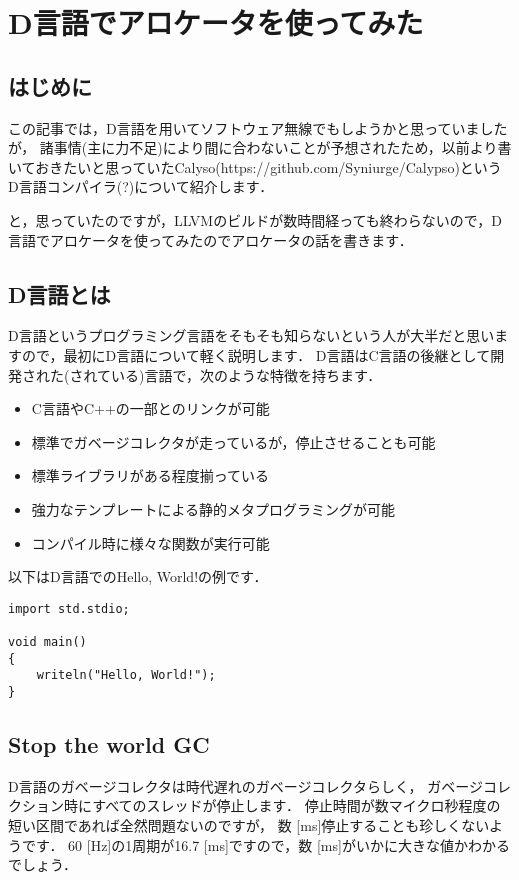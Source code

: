 \chapter{D言語でアロケータを使ってみた}

\section{はじめに}

この記事では，D言語を用いてソフトウェア無線でもしようかと思っていましたが，
諸事情(主に力不足)により間に合わないことが予想されたため，以前より書いておきたいと思っていたCalyso(https://github.com/Syniurge/Calypso)というD言語コンパイラ(?)について紹介します．

と，思っていたのですが，LLVMのビルドが数時間経っても終わらないので，D言語でアロケータを使ってみたのでアロケータの話を書きます．


\section{D言語とは}

D言語というプログラミング言語をそもそも知らないという人が大半だと思いますので，最初にD言語について軽く説明します．
D言語はC言語の後継として開発された(されている)言語で，次のような特徴を持ちます．

\begin{itemize}
\item C言語やC++の一部とのリンクが可能
\item 標準でガベージコレクタが走っているが，停止させることも可能
\item 標準ライブラリがある程度揃っている
\item 強力なテンプレートによる静的メタプログラミングが可能
\item コンパイル時に様々な関数が実行可能
\end{itemize}

以下はD言語でのHello, World!の例です．

\begin{lstlisting}[]
import std.stdio;

void main()
{
    writeln("Hello, World!");
}
\end{lstlisting}


\section{Stop the world GC}

D言語のガベージコレクタは時代遅れのガベージコレクタらしく，
ガベージコレクション時にすべてのスレッドが停止します．
停止時間が数マイクロ秒程度の短い区間であれば全然問題ないのですが，
数 [ms]停止することも珍しくないようです． 60 [Hz]の1周期が16.7
{[}ms{]}ですので，数 [ms]がいかに大きな値かわかるでしょう．

